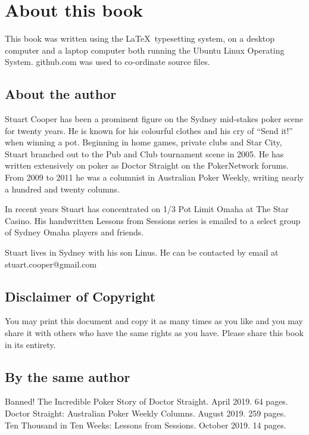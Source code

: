 \chapter*{About this book}


This book was written using the \LaTeX\ typesetting system, on a
desktop computer and a laptop computer both running the Ubuntu
Linux Operating System. github.com was used to co-ordinate source
files.

\section*{About the author}

Stuart Cooper has been a prominent figure on the Sydney mid-stakes poker
scene for twenty years. He is known for his colourful clothes
and his cry of ``Send it!'' when winning a pot.
Beginning in home games, private clubs
and Star City, Stuart branched out to the Pub and Club tournament
scene in 2005. He has written extensively on poker
as Doctor Straight on the PokerNetwork forums. From
2009 to 2011 he was a columnist in Australian Poker Weekly,
writing nearly a hundred and twenty columns.

In recent years Stuart has concentrated on 1/3 Pot Limit Omaha at
The Star Casino. His handwritten Lessons from Sessions series is
emailed to a select group of Sydney Omaha players and friends.

Stuart lives in Sydney with his son Linus. He
can be contacted by email at stuart.cooper@gmail.com

\section*{Disclaimer of Copyright}

You may print this document and copy it as many times as you like and
you may share it with others who have the same rights as you
have. Please share this book in its entirety.

\section*{By the same author}

Banned! The Incredible Poker Story of Doctor Straight. April 2019. 64 pages.\\
Doctor Straight: Australian Poker Weekly Columns. August 2019. 259 pages.\\
Ten Thousand in Ten Weeks: Lessons from Sessions. October 2019. 14 pages.

